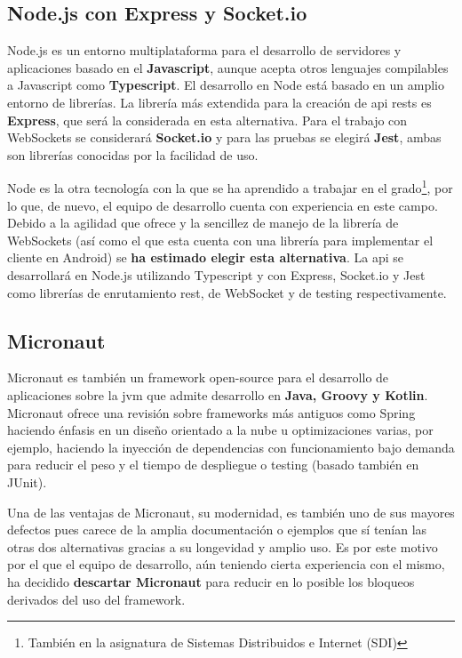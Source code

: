 \subsection{Node.js con Express y Socket.io}

Node.js es un entorno multiplataforma para el desarrollo de servidores y aplicaciones basado en el \textbf{Javascript}, aunque acepta otros lenguajes compilables a Javascript como \textbf{Typescript}. El desarrollo en Node está basado en un amplio entorno de librerías. La librería más extendida para la creación de \acrshort{api} \acrshort{rest}s es \textbf{Express}, que será la considerada en esta alternativa. Para el trabajo con WebSockets se considerará \textbf{Socket.io} y para las pruebas se elegirá \textbf{Jest}, ambas son librerías conocidas por la facilidad de uso.

Node es la otra tecnología con la que se ha aprendido a trabajar en el grado\footnote{También en la asignatura de Sistemas Distribuidos e Internet (SDI)}, por lo que, de nuevo, el equipo de desarrollo cuenta con experiencia en este campo. Debido a la agilidad que ofrece y la sencillez de manejo de la librería de WebSockets (así como el que esta cuenta con una librería para implementar el cliente en Android) se \textbf{ha estimado elegir esta alternativa}. La \acrshort{api} se desarrollará en Node.js utilizando Typescript y con Express, Socket.io y Jest como librerías de enrutamiento \acrshort{rest}, de WebSocket y de testing respectivamente.

\subsection{Micronaut}

Micronaut es también un framework open-source para el desarrollo de aplicaciones sobre la \acrshort{jvm} que admite desarrollo en \textbf{Java, Groovy y Kotlin}. Micronaut ofrece una revisión sobre frameworks más antiguos como Spring haciendo énfasis en un diseño orientado a la nube u optimizaciones varias, por ejemplo, haciendo la inyección de dependencias con funcionamiento bajo demanda para reducir el peso y el tiempo de despliegue o testing (basado también en JUnit).

Una de las ventajas de Micronaut, su modernidad, es también uno de sus mayores defectos pues carece de la amplia documentación o ejemplos que sí tenían las otras dos alternativas gracias a su longevidad y amplio uso. Es por este motivo por el que el equipo de desarrollo, aún teniendo cierta experiencia con el mismo, ha decidido \textbf{descartar Micronaut} para reducir en lo posible los bloqueos derivados del uso del framework.

